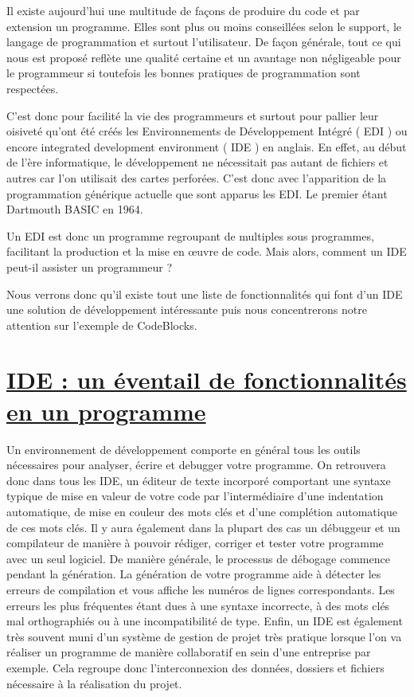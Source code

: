 \documentclass[a4paper, 12pt]{article}
\begin{document}
\begin{doublespace}

	Il existe aujourd'hui une multitude de façons de produire du code et par extension un programme. Elles sont plus ou moins conseillées selon le support, le langage de programmation et surtout l'utilisateur. De façon générale, tout ce qui nous est proposé reflète une qualité certaine et un avantage non négligeable pour le programmeur si toutefois les bonnes pratiques de programmation sont respectées.

	C'est donc pour facilité la vie des programmeurs et surtout pour pallier leur oisiveté qu'ont été créés les Environnements de Développement Intégré ( EDI ) ou encore integrated development environment ( IDE ) en anglais. En effet, au début de l'ère informatique, le développement ne nécessitait pas autant de fichiers et autres car l'on utilisait des cartes perforées. C'est donc avec l'apparition de la programmation générique actuelle que sont apparus les EDI. Le premier étant Dartmouth BASIC en 1964.

	Un EDI est donc un programme regroupant de multiples sous programmes, facilitant la production et la mise en œuvre de code. Mais alors, comment un IDE peut-il assister un programmeur ?

	Nous verrons donc qu'il existe tout une liste de fonctionnalités qui font d'un IDE une solution de développement intéressante puis nous concentrerons notre attention sur l'exemple de CodeBlocks.
\end{doublespace}

\newpage \section{\underline{IDE : un éventail de fonctionnalités en un programme}}

\begin{doublespace}
Un environnement de développement comporte en général tous les outils nécessaires pour analyser, écrire et debugger votre programme. On retrouvera donc dans tous les IDE, un éditeur de texte incorporé comportant une syntaxe typique de mise en valeur de votre code par l'intermédiaire d'une indentation automatique, de mise en couleur des mots clés et d'une complétion automatique de ces mots clés. Il y aura également dans la plupart des cas un débuggeur et un compilateur de manière à pouvoir rédiger, corriger et tester votre programme avec un seul logiciel. De manière générale, le processus de débogage commence pendant la génération. La génération de votre programme  aide à détecter les erreurs de compilation et vous affiche les numéros de lignes correspondants. Les erreurs les plus fréquentes étant dues à une syntaxe incorrecte, à des mots clés mal orthographiés ou à une incompatibilité de type.  Enfin, un IDE est également très souvent muni d’un système de gestion de projet très pratique lorsque l’on va réaliser un programme de manière collaboratif en sein d’une entreprise par exemple. Cela regroupe donc  l’interconnexion des données, dossiers et fichiers nécessaire à la réalisation du projet.

\end{doublespace}
\end{document}
